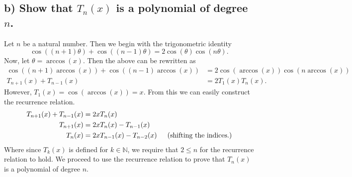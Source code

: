 \documentclass[11pt, letterpaper]{article}
\begin{document}
\subsection*{b) \normalfont Show that $T_n(x)$ is a polynomial of degree $n$.}
Let $n$ be a natural number. Then we begin with the trigonometric identity
\[\cos((n+1)\theta)+\cos((n-1)\theta)=2\cos(\theta)\cos(n\theta).\]
Now, let $\theta=\arccos(x)$. Then the above can be rewritten as
\begin{align*}
    \cos((n+1)\arccos(x))+\cos((n-1)\arccos(x))&=2\cos(\arccos(x))\cos(n\arccos(x))\\
    T_{n+1}(x)+T_{n-1}(x)&=2T_1(x)T_n(x).
\end{align*}
However, $T_1(x)=\cos(\arccos(x))=x$. From this we can easily construct the recurrence relation.
\begin{align*}
     T_{n+1}(x)+T_{n-1}(x)&=2xT_n(x)\\
     T_{n+1}(x)&=2xT_n(x)-T_{n-1}(x)\\
     T_{n}(x)&=2xT_{n-1}(x)-T_{n-2}(x) \text{\indent (shifting the indices.)}
\end{align*}
Where since $T_k(x)$ is defined for $k\in\mathbb{N}$, we require that $2\leq n$ for the recurrence
relation to hold. We proceed to use the recurrence relation to prove that $T_n(x)$ is a polynomial
of degree $n$. 
\end{document}
